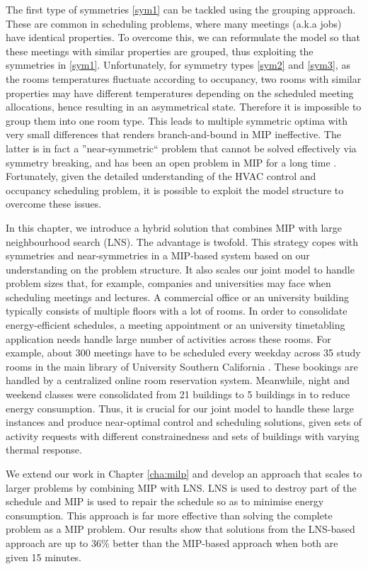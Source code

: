 The first type of symmetries \eqref{sym1} can be tackled using the grouping approach. These are common in scheduling problems, where many meetings (a.k.a jobs) have identical properties. To overcome this, we can reformulate the model so that these meetings with similar properties are grouped, thus exploiting the symmetries in \eqref{sym1}. Unfortunately, for symmetry types \eqref{sym2} and \eqref{sym3}, as the rooms temperatures fluctuate according to occupancy, two rooms with similar properties may have different temperatures depending on the scheduled meeting allocations, hence resulting in an asymmetrical state. Therefore it is impossible to group them into one room type. This leads to multiple symmetric optima with very small differences that renders branch-and-bound in MIP ineffective. The latter is in fact a ''near-symmetric`` problem that cannot be solved effectively via symmetry breaking, and has been an open problem in MIP for a long time \citep{ostrowski2010symmetry}. Fortunately, given the detailed understanding of the HVAC control and occupancy scheduling problem, it is possible to exploit the model structure to overcome these issues. 

In this chapter, we introduce a hybrid solution that combines MIP with large neighbourhood search (LNS). The advantage is twofold. This strategy copes with symmetries and near-symmetries in a MIP-based system based on our understanding on the problem structure. It also scales our joint model to handle problem sizes that, for example, companies and universities may face when scheduling meetings and lectures. A commercial office or an university building typically consists of multiple floors with a lot of rooms. In order to consolidate energy-efficient schedules, a meeting appointment or an university timetabling application needs handle large number of activities across these rooms. For example, about 300 meetings have to be scheduled every weekday across 35 study rooms in the main library of University Southern California \citep{kwak2013tesla}. These bookings are handled by a centralized online room reservation system. Meanwhile, night and weekend classes were consolidated from 21 buildings to 5 buildings in \cite{portland:2012} to reduce energy consumption. Thus, it is crucial for our joint model to handle these large instances and produce near-optimal control and scheduling solutions, given sets of activity requests with different constrainedness and sets of buildings with varying thermal response.

We extend our work in Chapter \ref{cha:milp} and develop an approach that scales to larger problems by combining MIP with LNS. LNS is used to destroy part of the schedule and MIP is used to repair the schedule so as to minimise energy consumption. This approach is far more effective than solving the complete problem as a MIP problem. Our results show that solutions from the LNS-based approach are up to 36\% better than the MIP-based approach when both are given 15 minutes. 

